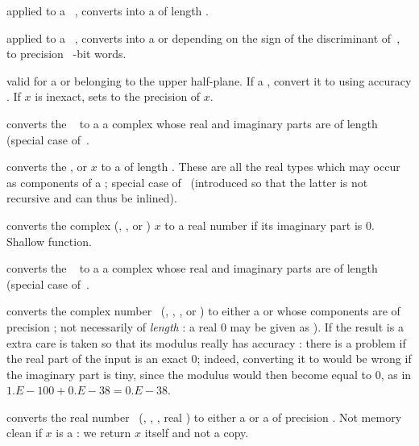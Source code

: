  applied to a ~, converts
 into a  of length .

 applied to a ~, converts
 into a  or  depending on the sign of the
discriminant of~, to precision \hbox{ \B-bit} words.

 valid for a 
or  belonging to the upper half-plane. If a , convert it
to  using accuracy . If $x$ is inexact, sets
 to the precision of $x$.

 converts the ~ to a
a complex whose real and imaginary parts are  of length 
(special case of~.

 converts the
,  or  $x$ to a  of length .
These are all the real types which may occur as components of a
; special case of~ (introduced so that the latter is
not recursive and can thus be inlined).

 converts the complex (, ,
 or ) $x$ to a real number if its imaginary part is 0.
Shallow function.

converts the ~ to a
a complex whose real and imaginary parts are  of length 
(special case of~.

 converts the complex number~
(, , ,  or ) to either
a  or  whose components are  of precision
; not necessarily of \emph{length} : a real $0$ may be
given as ). If the result is a  extra care is
taken so that its modulus really has accuracy : there is a problem
if the real part of the input is an exact $0$; indeed, converting it to
 would be wrong if the imaginary part is tiny, since the
modulus would then become equal to $0$, as in $1.E-100 + 0.E-38 = 0.E-38$.

 converts the real number~
(, , , real ) to either
a  or a  of precision . Not memory clean
if $x$ is a : we return $x$ itself and not a copy.

